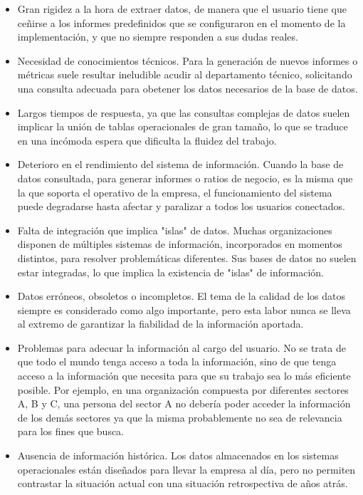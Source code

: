 \documentclass[a4paper,11pt]{article}
\begin{document}
    \begin{itemize}
      \item Gran rigidez a la hora de extraer datos, de manera que el usuario tiene que ceñirse a los informes predefinidos que se configuraron en el
      momento de la implementación, y que no siempre responden a sus dudas reales.
      \item Necesidad de conocimientos técnicos. Para la generación de nuevos informes o métricas suele resultar ineludible acudir al departamento técnico,
      solicitando una consulta adecuada para obetener los datos necesarios de la base de datos.
      \item Largos tiempos de respuesta, ya que las consultas complejas de datos suelen implicar la unión de tablas operacionales de gran tamaño, lo que se
      traduce en una incómoda espera que dificulta la fluidez del trabajo.
      \item Deterioro en el rendimiento del sistema de información. Cuando la base de datos consultada, para generar informes o ratios de negocio, es la
      misma que la que soporta el operativo de la empresa, el funcionamiento del sistema puede degradarse hasta afectar y paralizar a todos los usuarios
      conectados.
      \item Falta de integración que implica "islas" de datos. Muchas organizaciones disponen de múltiples sistemas de información, incorporados en
      momentos distintos, para resolver problemáticas diferentes. Sus bases de datos no suelen estar integradas, lo que implica la existencia de "islas"
      de información.
      \item Datos erróneos, obsoletos o incompletos. El tema de la calidad de los datos siempre es considerado como algo importante, pero esta labor nunca
      se lleva al extremo de garantizar la fiabilidad de la información aportada.
      \item Problemas para adecuar la información al cargo del usuario. No se trata de que todo el mundo tenga acceso a toda la información, sino de que
      tenga acceso a la información que necesita para que su trabajo sea lo más eficiente posible. Por ejemplo, en una organización compuesta por
      diferentes sectores A, B y C, una persona del sector A no debería poder acceder la información de los demás sectores ya que la misma probablemente
      no sea de relevancia para los fines que busca.
      \item Ausencia de información histórica. Los datos almacenados en los sistemas operacionales están diseñados para llevar la empresa al día, pero no
      permiten contrastar la situación actual con una situación retrospectiva de años atrás.
    \end{itemize}
    
\end{document}
